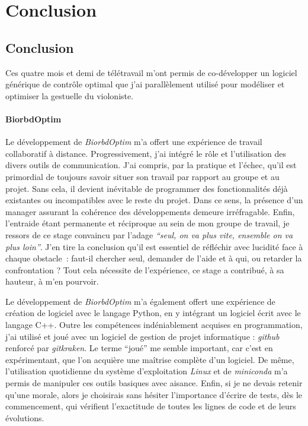 \part{Conclusion}
    \chapter{Conclusion}
Ces quatre mois et demi de télétravail m'ont permis de co-développer un logiciel générique de contrôle optimal que j'ai parallèlement utilisé pour modéliser et optimiser la gestuelle du violoniste.

    \subsection*{BiorbdOptim}
    
Le développement de \emph{BiorbdOptim} m'a offert une expérience de travail collaboratif à distance. Progressivement, j'ai intégré le rôle et l'utilisation des divers outils de communication. J'ai compris, par la pratique et l'échec, qu'il est primordial de toujours savoir situer son travail par rapport au groupe et au projet. Sans cela, il devient inévitable de programmer des fonctionnalités déjà existantes ou incompatibles avec le reste du projet. Dans ce sens, la présence d'un manager assurant la cohérence des développements demeure irréfragable. Enfin, l'entraide étant permanente et réciproque au sein de mon groupe de travail, je ressors de ce stage convaincu par l'adage \emph{``seul, on va plus vite, ensemble on va plus loin''}. J'en tire la conclusion qu'il est essentiel de réfléchir avec lucidité face à chaque obstacle~: faut-il chercher seul, demander de l'aide et à qui, ou retarder la confrontation ? Tout cela nécessite de l'expérience, ce stage a contribué, à sa hauteur, à m'en pourvoir.


Le développement de \emph{BiorbdOptim} m'a également offert une expérience de création de logiciel avec le langage Python, en y intégrant un logiciel écrit avec le langage C++. Outre les compétences indéniablement acquises en programmation, j'ai utilisé et joué avec un logiciel de gestion de projet informatique : \emph{github} renforcé par \emph{gitkraken}. Le terme ``joué'' me semble important, car c'est en expérimentant, que l'on acquière une maîtrise complète d'un logiciel.
De même, l'utilisation quotidienne du système d'exploitation \emph{Linux} et de \emph{miniconda} m'a permis de manipuler ces outils basiques avec aisance. Enfin, si je ne devais retenir qu'une morale, alors je choisirais sans hésiter l'importance d'écrire de tests, dès le commencement, qui vérifient l’exactitude de toutes les lignes de code et de leurs évolutions.

